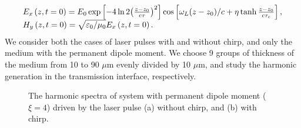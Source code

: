 \documentclass[10pt,letterpaper]{article}
\begin{document}
\begin{equation}
\begin{array}{l}
{E_x}\left( {z,t = 0} \right) = {E_0}\exp \left[ { - 4\ln 2{{\left( {\frac{{z - {z_0}}}{{c\tau }}} \right)}^2}} \right]\cos \left[ {{\omega _L}{{\left( {z - {z_0}} \right)} \mathord{\left/
			{\vphantom {{\left( {z - {z_0}} \right)} c}} \right.
			\kern-\nulldelimiterspace} c} + \eta \tanh \frac{{z - {z_0}}}{{c{\tau _c}}}} \right],\\
{H_y}\left( {z,t = 0} \right) = \sqrt {{{{\varepsilon _0}} \mathord{\left/
			{\vphantom {{{\varepsilon _0}} {{\mu _0}}}} \right.
			\kern-\nulldelimiterspace} {{\mu _0}}}} {E_x}\left( {z,t = 0} \right).
\end{array}
\label{eq20}
\end{equation} 
We consider both the cases of laser pulses with and without chirp, and only the medium with the permanent dipole moment. We choose 9 groups of thickness of the medium from 10 to 90 $ \mu $m evenly divided by 10 $ \mu $m, and study the harmonic generation in the transmission interface, respectively. 

\begin{figure}[H]
\centering
{}
\caption{The harmonic spectra of system with permanent dipole moment ($ \xi=4 $) driven by the laser pulse (a) without chirp, and (b) with chirp.}
\label{fig6}
\end{figure}
\end{document}
